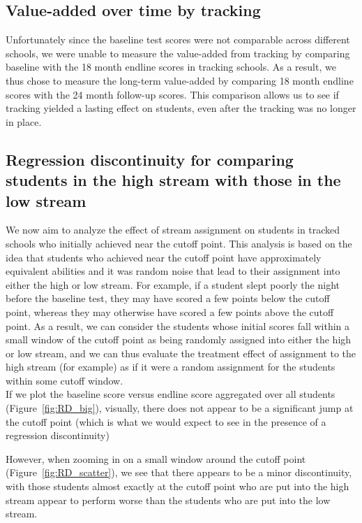 \documentclass[11pt]{article}
\begin{document}
 \subsection{Value-added over time by tracking}
 
Unfortunately since the baseline test scores were not comparable across different schools, we were unable to measure the value-added from tracking by comparing baseline with the 18 month endline scores in tracking schools. As a result, we thus chose to measure the long-term value-added by comparing 18 month endline scores with the 24 month follow-up scores. This comparison allows us to see if tracking yielded a lasting effect on students, even after the tracking was no longer in place.


 \subsection{Regression discontinuity for comparing students in the high stream with those in the low stream}
We now aim to analyze the effect of stream assignment on students in tracked schools who initially achieved near the cutoff point. This analysis is based on the idea that students who achieved near the cutoff point have approximately equivalent abilities and it was random noise that lead to their assignment into either the high or low stream. For example, if a student slept poorly the night before the baseline test, they may have scored a few points below the cutoff point, whereas they may otherwise have scored a few points above the cutoff point. As a result, we can consider the students whose initial scores fall within a small window of the cutoff point as being randomly assigned into either the high or low stream, and we can thus evaluate the treatment effect of assignment to the high stream (for example) as if it were a random assignment for the students within some cutoff window.\\
If we plot the baseline score versus endline score aggregated over all students (Figure~\ref{fig:RD_big}), visually, there does not appear to be a significant jump at the cutoff point (which is what we would expect to see in the presence of a regression discontinuity)

However, when zooming in on a small window around the cutoff point (Figure~\ref{fig:RD_scatter}), we see that there appears to be a minor discontinuity, with those students almost exactly at the cutoff point who are put into the high stream appear to perform worse than the students who are put into the low stream.
\end{document}
